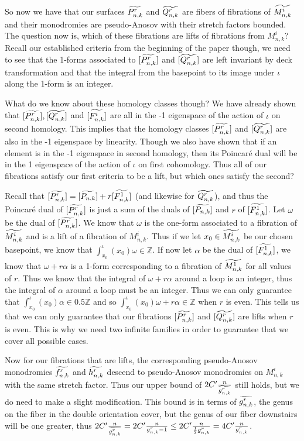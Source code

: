 So now we have that our surfaces $\widetilde{P^r_{n,k}}$ and $\widetilde{Q^r_{n,k}}$ are fibers of fibrations of $\widetilde{M^i_{n,k}}$ and their monodromies are pseudo-Anosov with their stretch factors bounded. The question now is, which of these fibrations are lifts of fibrations from $M^i_{n,k}$? Recall our established criteria from the beginning of the paper though, we need to see that the 1-forms associated to $[\widetilde{P^r_{n,k}}]$ and $[\widetilde{Q^r_{n,k}}]$ are left invariant by deck transformation and that the integral from the basepoint to its image under $\iota$ along the 1-form is an integer. 

What do we know about these homology classes though? We have already shown that $[\widetilde{P^r_{n,k}}],[\widetilde{Q^r_{n,k}}]$ and $[\widetilde{F^i_{n,k}}]$ are all in the -1 eigenspace of the action of $\iota$ on second homology. This implies that the homology classes $[\widetilde{P^r_{n,k}}]$ and $[\widetilde{Q^r_{n,k}}]$ are also in the -1 eigenspace by linearity. Though we also have shown that if an element is in the -1 eigenspace in second homology, then its Poincar\'e dual will be in the 1 eigenspace of the action of $\iota$ on first cohomology. Thus all of our fibrations satisfy our first criteria to be a lift, but which ones satisfy the second?  

Recall that $[\widetilde{P^r_{n,k}}] = [\widetilde{P_{n,k}}] + r[\widetilde{F^1_{n,k}}]$ (and likewise for $\widetilde{Q^r_{n,k}}$), and thus the Poincar\'e dual of $[\widetilde{P^r_{n,k}}]$ is just a sum of the duals of $[\widetilde{P_{n,k}}]$ and $r$ of $[\widetilde{F^1_{n,k}}]$. Let $\omega$ be the dual of $[\widetilde{P^r_{n,k}}]$. We know that $\omega$ is the one-form associated to a fibration of $\widetilde{M^i_{n,k}}$ and is a lift of a fibration of $M^i_{n,k}$. Thus if we let $x_0 \in \widetilde{M^i_{n,k}}$ be our chosen basepoint, we know that $\int_{x_0}^\iota(x_0) \omega \in \mathbb{Z}$. If now let $\alpha$ be the dual of $[\widetilde{F^1_{n,k}}]$, we know that $\omega + r\alpha$ is a 1-form corresponding to a fibration of $\widetilde{M^1_{n,k}}$ for all values of $r$. Thus we know that the integral of $\omega + r\alpha$ around a loop is an integer, thus the integral of $\alpha$ around a loop must be an integer. Thus we can only guarantee that $\int_{x_0}^\iota(x_0) \alpha \in 0.5\mathbb{Z}$ and so $\int_{x_0}^\iota(x_0) \omega + r\alpha \in \mathbb{Z}$ when $r$ is even. This tells us that we can only guarantee that our fibrations $[\widetilde{P^r_{n,k}}]$ and $[\widetilde{Q^r_{n,k}}]$ are lifts when $r$ is even. This is why we need two infinite families in order to guarantee that we cover all possible cases.

Now for our fibrations that are lifts, the corresponding pseudo-Anosov monodromies $\widetilde{f^r_{n,k}}$ and $\widetilde{h^r_{n,k}}$ descend to pseudo-Anosov monodromies on $M^i_{n,k}$ with the same stretch factor. Thus our upper bound of $2C'\frac{n}{\widetilde{g^{r}_{n,k}}}$ still holds, but we do need to make a slight modification. This bound is in terms of $\widetilde{g^r_{n,k}}$, the genus on the fiber in the double orientation cover, but the genus of our fiber downstairs will be one greater, thus $2C'\frac{n}{\widetilde{g^r_{n,k}}} = 2C'\frac{n}{g^r_{n,k} - 1} \leq 2C'\frac{n}{\frac{1}{2}g^r_{n,k}} = 4C'\frac{n}{g^r_{n,k}}$.

